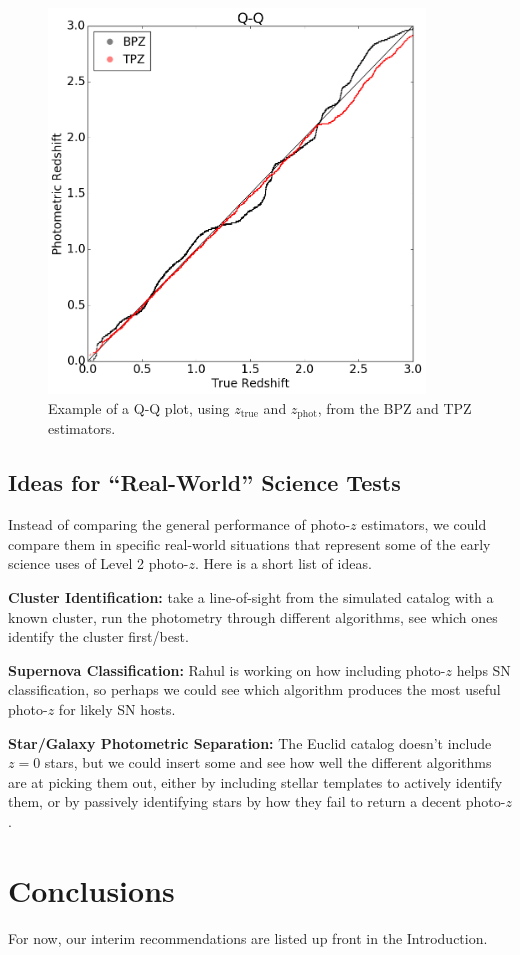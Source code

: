 \documentclass[DM,lsstdraft,toc]{lsstdoc}
\begin{document}
\begin{figure}
\begin{center}
\includegraphics[width=10cm]{figures/qq_BPZ_TPZ.png}
\caption{Example of a Q-Q plot, using $z_\mathrm{true}$ and $z_\mathrm{phot}$, from the BPZ and TPZ estimators.}\label{fig:qq}
\end{center}
\end{figure}


\subsection{Ideas for ``Real-World'' Science Tests}\label{ssec:more}

Instead of comparing the general performance of photo-$z$ estimators, we could compare them in specific real-world situations that represent some of the early science uses of Level 2 photo-$z$. Here is a short list of ideas.

\textbf{Cluster Identification:} take a line-of-sight from the simulated catalog with a known cluster, run the photometry through different algorithms, see which ones identify the cluster first/best.

\textbf{Supernova Classification:} Rahul is working on how including photo-$z$ helps SN classification, so perhaps we could see which algorithm produces the most useful photo-$z$ for likely SN hosts.

\textbf{Star/Galaxy Photometric Separation:} The Euclid catalog doesn't include $z=0$ stars, but we could insert some and see how well the different algorithms are at picking them out, either by including stellar templates to actively identify them, or by passively identifying stars by how they fail to return a decent photo-$z$.

\section{Conclusions}

For now, our interim recommendations are listed up front in the Introduction.


\end{document}
